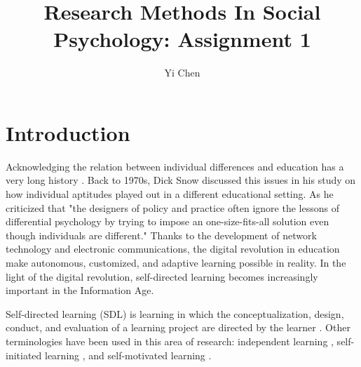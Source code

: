 \documentclass[man,biblatex,apacite]{apa6}
\author{Yi Chen}
\affiliation{Teachers College, Columbia University}
\title{Research Methods In Social Psychology: Assignment 1}
\begin{document}
\maketitle
\section{Introduction}
Acknowledging the relation between individual differences and education has a very long history \cite{Shute2003}. 
Back to 1970s, Dick Snow discussed this issues in his study on how individual aptitudes played out in a different educational setting. 
As he criticized that "the designers of policy and practice often ignore the lessons of differential psychology by trying to impose an one-size-fits-all solution even though individuals are different." 
Thanks to the development of network technology and electronic communications, the digital revolution in education make autonomous, customized, and adaptive learning possible in reality. 
In the light of the digital revolution, self-directed learning becomes increasingly important in the Information Age.

Self-directed learning (SDL) is learning in which the conceptualization, design, conduct, and evaluation of a learning project are directed by the learner \cite{Brookfield2006}.
Other terminologies have been used in this area of research: independent learning \cite{Brookfield2006}, self-initiated learning \cite{Levinsen2011}, and self-motivated learning \cite{Bonarini2006}.
\end{document}
